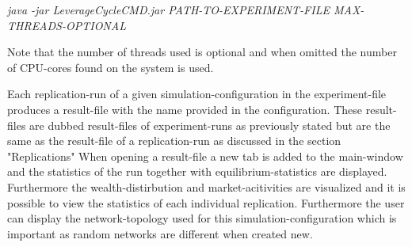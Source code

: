 \documentclass[Bachelorarbeit.tex]{subfiles}
\begin{document}
\begin{center}
\textit{java -jar LeverageCycleCMD.jar PATH-TO-EXPERIMENT-FILE MAX-THREADS-OPTIONAL}
\end{center}

Note that the number of threads used is optional and when omitted the number of CPU-cores found on the system is used. 

\medskip

Each replication-run of a given simulation-configuration in the experiment-file produces a result-file with the name provided in the configuration. These result-files are dubbed result-files of experiment-runs as previously stated but are the same as the result-file of a replication-run as discussed in the section "Replications"
When opening a result-file a new tab is added to the main-window and the statistics of the run together with equilibrium-statistics are displayed. Furthermore the wealth-distirbution and market-acitivities are visualized and it is possible to view the statistics of each individual replication. Furthermore the user can display the network-topology used for this simulation-configuration which is important as random networks are different when created new.
\end{document}
